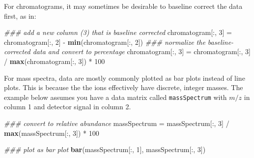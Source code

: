 \documentclass[]{tufte-book}
\newenvironment{Shaded}{}{}
\newcommand{\CommentTok}[1]{\textcolor[rgb]{0.38,0.63,0.69}{\textit{#1}}}
\newcommand{\DecValTok}[1]{\textcolor[rgb]{0.25,0.63,0.44}{#1}}
\newcommand{\KeywordTok}[1]{\textcolor[rgb]{0.00,0.44,0.13}{\textbf{#1}}}
\newcommand{\NormalTok}[1]{#1}
\newcommand{\OperatorTok}[1]{\textcolor[rgb]{0.40,0.40,0.40}{#1}}
\newcommand{\StringTok}[1]{\textcolor[rgb]{0.25,0.44,0.63}{#1}}
\begin{document}
For chromatograms, it may sometimes be desirable to baseline correct the data first, as in:

\begin{Shaded}
\begin{Highlighting}[]
\CommentTok{### add a new column (3) that is baseline corrected}
\NormalTok{chromatogram[}\OperatorTok{:}\NormalTok{, }\DecValTok{3}\NormalTok{] =}\StringTok{ }\NormalTok{chromatogram[}\OperatorTok{:}\NormalTok{, }\DecValTok{2}\NormalTok{] }\OperatorTok{-}\StringTok{ }\KeywordTok{min}\NormalTok{(chromatogram[}\OperatorTok{:}\NormalTok{, }\DecValTok{2}\NormalTok{])}
\CommentTok{### normalize the baseline-corrected data and convert to percentage}
\NormalTok{chromatogram[}\OperatorTok{:}\NormalTok{, }\DecValTok{3}\NormalTok{] =}\StringTok{ }\NormalTok{chromatogram[}\OperatorTok{:}\NormalTok{, }\DecValTok{3}\NormalTok{] }\OperatorTok{/}\StringTok{ }\KeywordTok{max}\NormalTok{(chromatogram[}\OperatorTok{:}\NormalTok{, }\DecValTok{3}\NormalTok{]) }\OperatorTok{*}\StringTok{ }\DecValTok{100}
\end{Highlighting}
\end{Shaded}

For mass spectra, data are mostly commonly plotted as bar plots instead of line plots. This is because the the ions effectively have discrete, integer masses. The example below assumes you have a data matrix called \texttt{massSpectrum} with \(m/z\) in column 1 and detector signal in column 2.

\begin{Shaded}
\begin{Highlighting}[]
\CommentTok{### convert to relative abundance}
\NormalTok{massSpectrum =}\StringTok{ }\NormalTok{massSpectrum[}\OperatorTok{:}\NormalTok{, }\DecValTok{3}\NormalTok{] }\OperatorTok{/}\StringTok{ }\KeywordTok{max}\NormalTok{(massSpectrum[}\OperatorTok{:}\NormalTok{, }\DecValTok{3}\NormalTok{]) }\OperatorTok{*}\StringTok{ }\DecValTok{100}

\CommentTok{### plot as bar plot}
\KeywordTok{bar}\NormalTok{(massSpectrum[}\OperatorTok{:}\NormalTok{, }\DecValTok{1}\NormalTok{], massSpectrum[}\OperatorTok{:}\NormalTok{, }\DecValTok{3}\NormalTok{])}
\end{Highlighting}
\end{Shaded}
\end{document}
